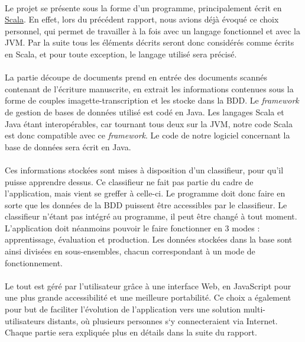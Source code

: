 \paragraph{}
Le projet se présente sous la forme d’un programme, principalement écrit en
\href{http://scala-lang.org}{Scala}. En effet, lors du précédent rapport,
nous avions déjà évoqué ce choix personnel, qui permet de travailler à la
fois avec un langage fonctionnel et avec la JVM. Par la suite tous les éléments
décrits seront donc considérés comme écrits en Scala, et pour toute exception,
le langage utilisé sera précisé.

\paragraph{}

La partie découpe de documents prend en entrée des documents scannés contenant
de l’écriture manuscrite, en extrait les informations contenues sous la forme
de couples imagette-transcription et les stocke dans la BDD. Le
\textit{framework} de gestion de bases de données utilisé est codé en Java.
Les langages Scala et Java étant interopérables, car tournant tous deux sur la
JVM, notre code Scala est donc compatible avec ce \textit{framework}. Le code
de notre logiciel concernant la base de données sera écrit en Java.

\paragraph{}
Ces informations stockées sont mises à disposition d’un classifieur, pour qu’il
puisse apprendre dessus. Ce classifieur ne fait pas partie du cadre de
l’application, mais vient se greffer à celle-ci. Le programme doit donc faire
en sorte que les données de la BDD puissent être accessibles par le classifieur.
Le classifieur n’étant pas intégré au programme, il peut être changé à tout
moment. L’application doit néanmoins pouvoir le faire fonctionner en 3 modes :
apprentissage, évaluation et production. Les données stockées dans la base sont
ainsi divisées en sous-ensembles, chacun correspondant à un mode de
fonctionnement.

\paragraph{}
Le tout est géré par l’utilisateur grâce à une interface Web, en JavaScript
pour une plus grande accessibilité et une meilleure portabilité. Ce choix a
également pour but de faciliter l’évolution de l’application vers une solution
multi-utilisateurs distants, où plusieurs personnes s‘y connecteraient via
Internet. Chaque partie sera expliquée plus en détails dans la suite du rapport.

